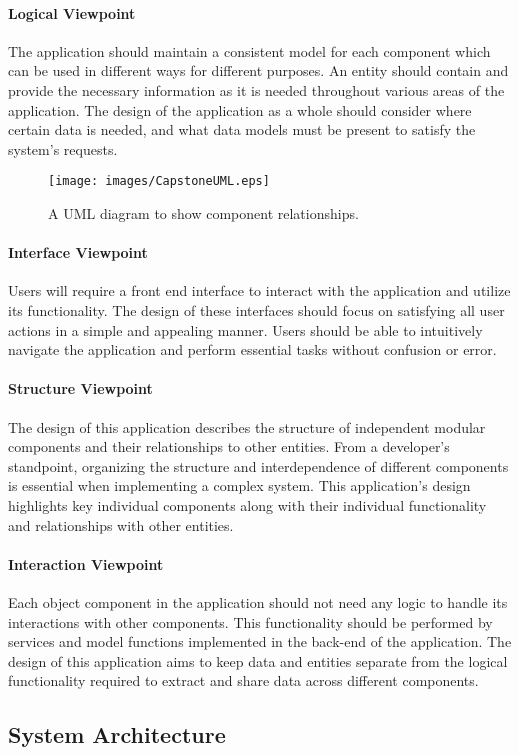 \paragraph{Logical Viewpoint}  
The application should maintain a consistent model for each component which can be used in different ways for different purposes. An entity should contain and provide the necessary information as it is needed throughout various areas of the application. The design of the application as a whole should consider where certain data is needed, and what data models must be present to satisfy the system's requests.
\begin{figure}[H]
    \centering
    \texttt{[image: images/CapstoneUML.eps]}
    \caption{A UML diagram to show component relationships.}
\end{figure}
\paragraph{Interface Viewpoint}  
Users will require a front end interface to interact with the application and utilize its functionality. The design of these interfaces should focus on satisfying all user actions in a simple and appealing manner. Users should be able to intuitively navigate the application and perform essential tasks without confusion or error.
\paragraph{Structure Viewpoint} 
The design of this application describes the structure of independent modular components and their relationships to other entities. From a developer's standpoint, organizing the structure and interdependence of different components is essential when implementing a complex system. This application's design highlights key individual components along with their individual functionality and relationships with other entities. 
\paragraph{Interaction Viewpoint}  
Each object component in the application should not need any logic to handle its interactions with other components. This functionality should be performed by services and model functions implemented in the back-end of the application. The design of this application aims to keep data and entities separate from the logical functionality required to extract and share data across different components.
\subsection{System Architecture}
